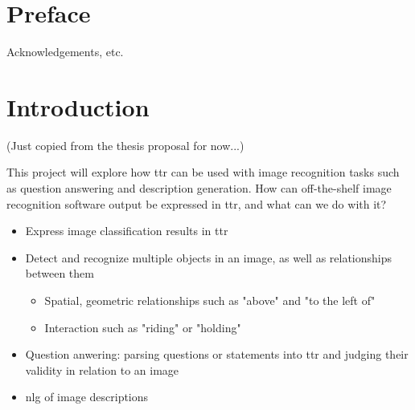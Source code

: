 \documentclass[11pt, a4paper]{article}
\begin{document}
\section*{Preface}

Acknowledgements, etc.

\thispagestyle{empty}

\newpage

\begin{spacing}{0.0}
\tableofcontents
\end{spacing}

\thispagestyle{empty}

\newpage
\setcounter{page}{1}

\section{Introduction}
\label{sec:intro}

(Just copied from the thesis proposal for now...)

This project will explore how \gls{ttr} can be used with image recognition tasks such as question answering and description generation.
How can off-the-shelf image recognition software output be expressed in \gls{ttr}, and what can we do with it?

\begin{itemize}
\item Express image classification results in \gls{ttr}
\item Detect and recognize multiple objects in an image, as well as relationships between them
\begin{itemize}
\item Spatial, geometric relationships such as "above" and "to the left of"
\item Interaction such as "riding" or "holding"
\end{itemize}
\item Question anwering: parsing questions or statements into \gls{ttr} and judging their validity in relation to an image
\item \gls{nlg} of image descriptions
\end{itemize}
\end{document}
